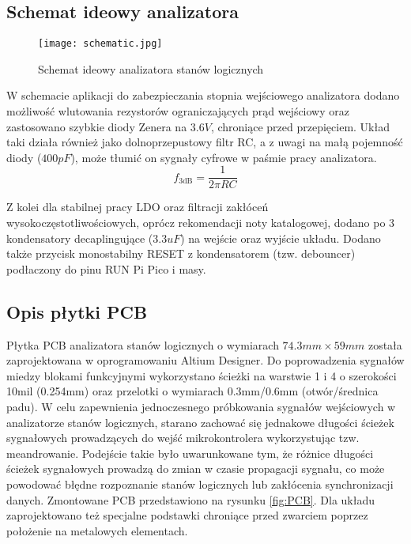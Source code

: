 \useNormalLandscape{}
\subsection{Schemat ideowy analizatora}
    \begin{figure}[!ht]
        \centering
        \texttt{[image: schematic.jpg]}
        \caption{Schemat ideowy analizatora stanów logicznych}
    \end{figure}
\usePortrait{}

    W schemacie aplikacji do zabezpieczania stopnia wejściowego analizatora dodano możliwość wlutowania rezystorów ograniczających
    prąd wejściowy oraz zastosowano szybkie diody Zenera na $3.6V$, chroniące przed przepięciem.
    Układ taki działa również jako dolnoprzepustowy filtr RC, a z uwagi na małą pojemność diody ($400pF$), może tłumić on sygnały cyfrowe w paśmie pracy analizatora.
    \begin{equation*}
    f_{3\mathrm{dB}} = \frac{1}{2\pi RC}
    \end{equation*}

    Z kolei dla stabilnej pracy LDO oraz filtracji zakłóceń wysokoczęstotliwościowych, oprócz rekomendacji
    noty katalogowej, dodano po 3 kondensatory decaplingujące ($3.3uF$) na wejście oraz wyjście układu. 
    Dodano także przycisk monostabilny RESET z kondensatorem (tzw. debouncer) podłaczony do pinu RUN Pi Pico i masy.




\subsection{Opis płytki PCB}

    Płytka PCB analizatora stanów logicznych o wymiarach $74.3mm \times 59mm$ została zaprojektowana w oprogramowaniu Altium Designer.
    Do poprowadzenia sygnałów miedzy blokami funkcyjnymi wykorzystano ścieżki na warstwie 1 i 4 o szerokości 10mil (0.254mm)
    oraz przelotki o wymiarach 0.3mm/0.6mm (otwór/średnica padu). 
    W celu zapewnienia jednoczesnego próbkowania sygnałów wejściowych w analizatorze stanów logicznych, starano zachować się
    jednakowe długości ścieżek sygnałowych prowadzących do wejść mikrokontrolera wykorzystując tzw. meandrowanie.
    Podejście takie było uwarunkowane tym, że różnice długości ścieżek sygnałowych prowadzą do zmian w czasie propagacji
    sygnału, co może powodować błędne rozpoznanie stanów logicznych lub zakłócenia synchronizacji danych. Zmontowane PCB
    przedstawiono na rysunku \ref{fig:PCB}. Dla układu zaprojektowano też specjalne podstawki chroniące przed zwarciem
    poprzez położenie na metalowych elementach.
    
